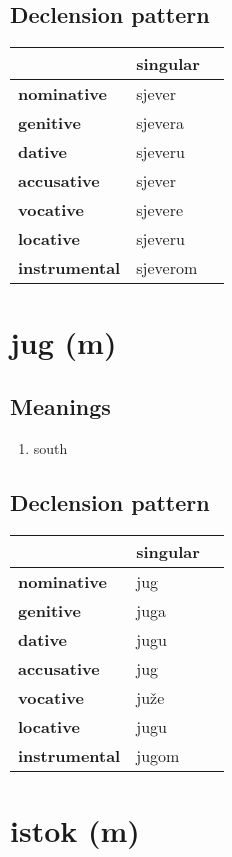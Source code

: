 \subsection*{Declension pattern}
\begin{tabularx}{\linewidth}{Xll}
\toprule
{} &  singular \\
\midrule
\textbf{nominative  } &    sjever \\
\textbf{genitive    } &   sjevera \\
\textbf{dative      } &   sjeveru \\
\textbf{accusative  } &    sjever \\
\textbf{vocative    } &   sjevere \\
\textbf{locative    } &   sjeveru \\
\textbf{instrumental} &  sjeverom \\
\bottomrule
\end{tabularx}

\filbreak
\section{jug (m)}
\subsection*{Meanings}
\begin{enumerate}
\item south
\end{enumerate}
\subsection*{Declension pattern}
\begin{tabularx}{\linewidth}{Xll}
\toprule
{} & singular \\
\midrule
\textbf{nominative  } &      jug \\
\textbf{genitive    } &     juga \\
\textbf{dative      } &     jugu \\
\textbf{accusative  } &      jug \\
\textbf{vocative    } &     juže \\
\textbf{locative    } &     jugu \\
\textbf{instrumental} &    jugom \\
\bottomrule
\end{tabularx}

\filbreak
\section{istok (m)}

